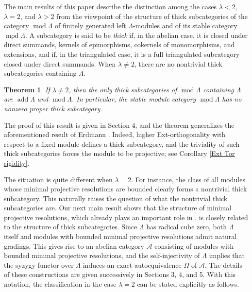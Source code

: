 \documentclass{amsart}
\newtheorem{thm}{Theorem}[section]
\theoremstyle{definition}
\theoremstyle{remark}
\numberwithin{equation}{thm}
\def\A{\mathcal{A}}
\def\add{\operatorname{add}}
\def\L{\Lambda}
\def\mod{\operatorname{mod}}
\begin{document}
The main results of this paper describe the distinction among the cases $\lambda<2$, $\lambda=2$, and $\lambda>2$ from the viewpoint of the structure of thick subcategories of the category $\mod\L$ of finitely generated left $\L$-modules and of its stable category $\underline{\mod}\L$.
A subcategory is said to be \textit{thick} if, in the abelian case, it is closed under direct summands, kernels of epimorphisms, cokernels of monomorphisms, and extensions, and if, in the triangulated case, it is a full triangulated subcategory closed under direct summands.
When $\lambda\ne2$, there are no nontrivial thick subcategories containing $\L$.

\begin{thm}\label{thm1.1}
If $\lambda\ne 2$, then the only thick subcategories of $\mod\L$ containing $\L$ are $\add\L$ and $\mod\L$. In particular, the stable module category $\underline{\mod}\L$ has no nonzero proper thick subcategory.
\end{thm}

\noindent The proof of this result is given in Section 4, and the theorem generalizes the aforementioned result of Erdmann \cite{E}.
Indeed, higher Ext-orthogonality with respect to a fixed module defines a thick subcategory, and the triviality of such thick subcategories forces the module to be projective; see Corollary \ref{Ext Tor rigidity}.


The situation is quite different when $\lambda=2$. 
For instance, the class of all modules whose minimal projective resolutions are bounded clearly forms a nontrivial thick subcategory.
This naturally raises the question of what the nontrivial thick subcategories are.
Our next main result shows that the structure of minimal projective resolutions, which already plays an important role in \cite{Ben}, is closely related to the structure of thick subcategories.
Since $\L$ has radical cube zero, both $\L$ itself and modules with bounded minimal projective resolutions admit natural gradings.
This gives rise to an abelian category $\A$ consisting of modules with bounded minimal projective resolutions, and the self-injectivity of $\L$ implies that the syzygy functor over $\L$ induces an exact autoequivalence $\Omega$ of $\A$.
The details of these constructions are given successively in Sections 3, 4, and 5.
With this notation, the classification in the case $\lambda=2$ can be stated explicitly as follows.
\end{document}
